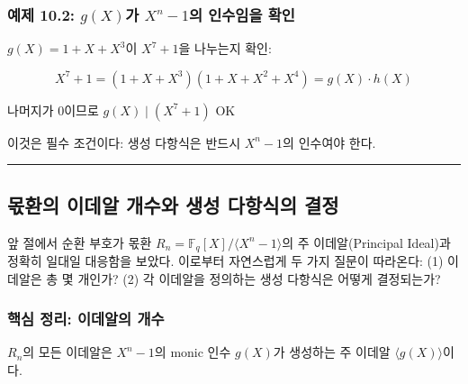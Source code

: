 \documentclass[
  oneside]{article}
\begin{document}
\subsubsection{\texorpdfstring{예제 10.2: \(g(X)\)가 \(X^n - 1\)의
인수임을
확인}{예제 10.2: g(X)가 X\^{}n - 1의 인수임을 확인}}\label{uxc608uxc81c-10.2-gxuxac00-xn---1uxc758-uxc778uxc218uxc784uxc744-uxd655uxc778}

\(g(X) = 1 + X + X^3\)이 \(X^7 + 1\)을 나누는지 확인:

\[X^7 + 1 = (1 + X + X^3)(1 + X + X^2 + X^4) = g(X) \cdot h(X)\]

나머지가 0이므로 \(g(X) \mid (X^7 + 1)\) OK

이것은 필수 조건이다: 생성 다항식은 반드시 \(X^n - 1\)의 인수여야 한다.

\begin{center}\rule{0.5\linewidth}{0.5pt}\end{center}

\subsection{몫환의 이데알 개수와 생성 다항식의
결정}\label{uxbaabuxd658uxc758-uxc774uxb370uxc54c-uxac1cuxc218uxc640-uxc0dduxc131-uxb2e4uxd56duxc2dduxc758-uxacb0uxc815}

앞 절에서 순환 부호가 몫환
\(R_n = \mathbb{F}_q[X]/ \langle X^n - 1 \rangle\)의 주 이데알(Principal
Ideal)과 정확히 일대일 대응함을 보았다. 이로부터 자연스럽게 두 가지
질문이 따라온다: (1) 이데알은 총 몇 개인가? (2) 각 이데알을 정의하는
생성 다항식은 어떻게 결정되는가?

\subsubsection{핵심 정리: 이데알의
개수}\label{uxd575uxc2ec-uxc815uxb9ac-uxc774uxb370uxc54cuxc758-uxac1cuxc218}

\(R_n\)의 모든 이데알은 \(X^n - 1\)의 monic 인수 \(g(X)\)가 생성하는 주
이데알 \(\langle g(X) \rangle\)이다.
\end{document}

